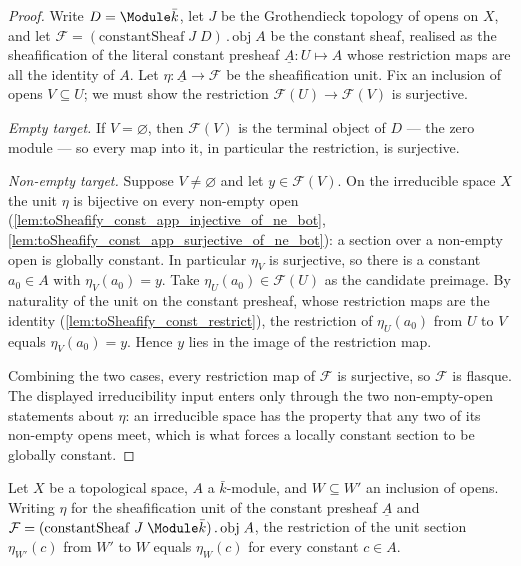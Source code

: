 \begin{proof}
  \leanok
  Write \(D = \Module \bar k\), let \(J\) be the Grothendieck topology of
  opens on \(X\), and let
  \(\mathcal F = (\mathrm{constantSheaf}\;J\;D)\,.\,\mathrm{obj}\;A\) be the
  constant sheaf, realised as the sheafification of the literal constant
  presheaf \(\underline A \colon U \mapsto A\) whose restriction maps are
  all the identity of \(A\). Let \(\eta \colon \underline A \to
  \mathcal F\) be the sheafification unit. Fix an inclusion of opens
  \(V \subseteq U\); we must show the restriction
  \(\mathcal F(U) \to \mathcal F(V)\) is surjective.

  \emph{Empty target.} If \(V = \varnothing\), then \(\mathcal F(V)\) is
  the terminal object of \(D\) — the zero module — so every map into it,
  in particular the restriction, is surjective.

  \emph{Non-empty target.} Suppose \(V \neq \varnothing\) and let
  \(y \in \mathcal F(V)\). On the irreducible space \(X\) the unit
  \(\eta\) is bijective on every non-empty open
  (\cref{lem:toSheafify_const_app_injective_of_ne_bot},
  \cref{lem:toSheafify_const_app_surjective_of_ne_bot}): a section over a
  non-empty open is globally constant. In particular \(\eta_V\) is
  surjective, so there is a constant \(a_0 \in A\) with
  \(\eta_V(a_0) = y\). Take \(\eta_U(a_0) \in \mathcal F(U)\) as the
  candidate preimage. By naturality of the unit on the constant presheaf,
  whose restriction maps are the identity
  (\cref{lem:toSheafify_const_restrict}), the restriction of
  \(\eta_U(a_0)\) from \(U\) to \(V\) equals \(\eta_V(a_0) = y\). Hence
  \(y\) lies in the image of the restriction map.

  Combining the two cases, every restriction map of \(\mathcal F\) is
  surjective, so \(\mathcal F\) is flasque. The displayed irreducibility
  input enters only through the two non-empty-open statements about
  \(\eta\): an irreducible space has the property that any two of its
  non-empty opens meet, which is what forces a locally constant section
  to be globally constant.
\end{proof}

\begin{lemma}
  \label{lem:toSheafify_const_restrict}
  Let \(X\) be a topological space, \(A\) a \(\bar k\)-module, and
  \(W \subseteq W'\) an inclusion of opens. Writing \(\eta\) for the
  sheafification unit of the constant presheaf \(\underline A\) and
  \(\mathcal F = (\mathrm{constantSheaf}\;J\;\Module \bar k)\,.\,
  \mathrm{obj}\;A\), the restriction of the unit section \(\eta_{W'}(c)\)
  from \(W'\) to \(W\) equals \(\eta_W(c)\) for every constant
  \(c \in A\).
\end{lemma}

